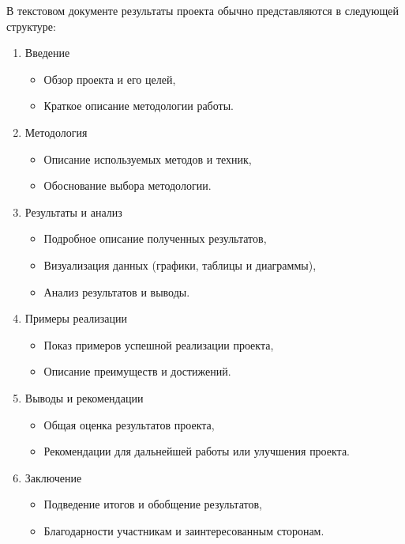 В текстовом документе результаты проекта обычно представляются в следующей структуре:
\begin{enumerate}
    \item Введение
        \begin{itemize}
            \item Обзор проекта и его целей,
            \item Краткое описание методологии работы.
        \end{itemize}
    \item Методология
        \begin{itemize}
            \item Описание используемых методов и техник,
            \item Обоснование выбора методологии.
        \end{itemize}
    \item Результаты и анализ
        \begin{itemize}
            \item Подробное описание полученных результатов,
            \item Визуализация данных (графики, таблицы и диаграммы),
            \item Анализ результатов и выводы.
        \end{itemize}
    \item Примеры реализации
        \begin{itemize}
            \item Показ примеров успешной реализации проекта,
            \item Описание преимуществ и достижений.
        \end{itemize}
    \item Выводы и рекомендации
        \begin{itemize}
            \item Общая оценка результатов проекта,
            \item Рекомендации для дальнейшей работы или улучшения проекта.
        \end{itemize}
    \item Заключение
        \begin{itemize}
            \item Подведение итогов и обобщение результатов,
            \item Благодарности участникам и заинтересованным сторонам.
        \end{itemize}
\end{enumerate}


